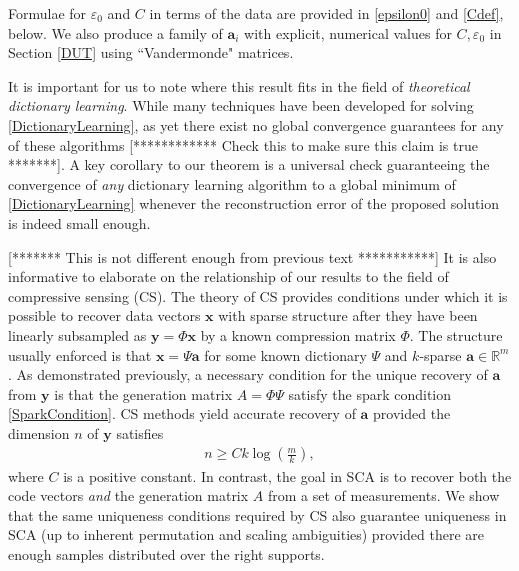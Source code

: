 \documentclass[journal, onecolumn]{IEEEtran}
\begin{document}
Formulae for $\varepsilon_0$ and $C$ in terms of the data are provided in \eqref{epsilon0} and \eqref{Cdef}, below. We also produce a family of $\mathbf{a}_i$ with explicit, numerical values for $C,\varepsilon_0$ in Section \ref{DUT} using ``Vandermonde" matrices. 


It is important for us to note where this result fits in the field of \emph{theoretical dictionary learning}. While many techniques have been developed for solving \eqref{DictionaryLearning}, as yet there exist no global convergence guarantees for any of these algorithms [************ Check this to make sure this claim is true *******]. A key corollary to our theorem is a universal check guaranteeing the convergence of \emph{any} dictionary learning algorithm to a global minimum of \eqref{DictionaryLearning} whenever the reconstruction error of the proposed solution is indeed small enough. 

[*******  This is not different enough from previous text ***********]
It is also informative to elaborate on the relationship of our results to the field of compressive sensing (CS). The theory of CS provides conditions under which it is possible to recover data vectors $\mathbf{x}$ with sparse structure after they have been linearly subsampled as $\mathbf{y} = \Phi \mathbf{x}$ by a known compression matrix $\Phi$. The structure usually enforced is that $\mathbf{x} = \Psi \mathbf{a}$ for some known dictionary $\Psi$ and $k$-sparse $\mathbf{a} \in \mathbb{R}^m$. As demonstrated previously, a necessary condition for the unique recovery of $\mathbf{a}$ from $\mathbf{y}$ is that the generation matrix $A = \Phi\Psi$ satisfy the spark condition \eqref{SparkCondition}. CS methods yield accurate recovery of $\mathbf{a}$ provided the dimension $n$ of $\mathbf{y}$ satisfies
\begin{align}\label{CScondition}
n \geq Ck\log\left(\frac{m}{k}\right),
\end{align}
%
where $C$ is a positive constant. In contrast, the goal in SCA is to recover both the code vectors \emph{and} the generation matrix $A$ from a set of measurements. We show that the same uniqueness conditions required by CS also guarantee uniqueness in SCA (up to inherent permutation and scaling ambiguities) provided there are enough samples distributed over the right supports.
\end{document}

